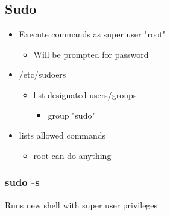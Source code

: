 \documentclass{report}
\begin{document}
    \bigbreak \noindent 
    \subsection{Sudo}
    \begin{itemize}
        \item Execute commands as super user "root"
            \begin{itemize}
                \item Will be prompted for password  
            \end{itemize}
        \item /etc/sudoers
            \begin{itemize}
                \item list designated users/groups
                    \begin{itemize}
                        \item group "sudo"
                    \end{itemize}
            \end{itemize}
        \item lists allowed commands
            \begin{itemize}
                \item root can do anything
            \end{itemize}
    \end{itemize}

    \bigbreak \noindent 
    \subsubsection{sudo -s}
    \bigbreak \noindent 
    Runs new shell with super user privileges

    \bigbreak \noindent 
\end{document}
